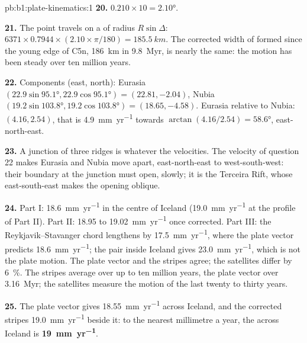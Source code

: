 \begin{solution}{pb:b1:plate-kinematics:1}
\textbf{20.} $0.210\times10 = \ang{2.10}$.

\textbf{21.} The point travels on a  of radius $R\sin\Delta$:
$6371\times0.7944\times(2.10\times\pi/180) = \qty{185.5}{km}$. The corrected
width of  formed since the young edge of C5n, \qty{186}{km} in
\qty{9.8}{Myr}, is nearly the same: the motion has been steady over ten
million years.

\textbf{22.} Components (east, north): Eurasia
$(22.9\sin\ang{95.1}, 22.9\cos\ang{95.1}) = (22.81, -2.04)$, Nubia
$(19.2\sin\ang{103.8}, 19.2\cos\ang{103.8}) = (18.65, -4.58)$. Eurasia relative
to Nubia: $(4.16, 2.54)$, that is \qty{4.9}{mm.yr^{-1}} towards
$\arctan(4.16/2.54) = \ang{58.6}$, east-north-east.

\textbf{23.} A junction of three ridges is  whatever the velocities. The
velocity of question 22 makes Eurasia and Nubia move apart, east-north-east to
west-south-west: their boundary at the junction must open, slowly; it is the
Terceira Rift, whose east-south-east  makes the opening oblique.

\textbf{24.} Part I: \qty{18.6}{mm.yr^{-1}} in the centre of Iceland
(\qty{19.0}{mm.yr^{-1}} at the profile of Part II). Part II: 18.95 to
\qty{19.02}{mm.yr^{-1}} once corrected. Part III: the Reykjavik--Stavanger
chord lengthens by \qty{17.5}{mm.yr^{-1}}, where the plate vector predicts
\qty{18.6}{mm.yr^{-1}}; the pair inside Iceland gives \qty{23.0}{mm.yr^{-1}},
which is not the plate motion. The plate vector and the stripes agree; the
satellites differ by \qty{6}{\percent}. The stripes average over up to ten
million years, the plate vector over \qty{3.16}{Myr}; the satellites measure
the motion of the last twenty to thirty years.

\textbf{25.} The plate vector gives \qty{18.55}{mm.yr^{-1}} across Iceland, and
the corrected stripes \qty{19.0}{mm.yr^{-1}} beside it: to the nearest
millimetre a year, the  across Iceland is
\textbf{\qty[text-series-to-math=true]{19}{mm.yr^{-1}}}.
\end{solution}
